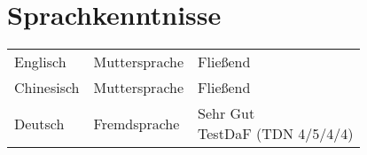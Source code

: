 \section{\textcolor{section_4}{Sprachkenntnisse}}
	\begin{center}
		\renewcommand{\arraystretch}{1.3}
		\renewcommand{\cellalign}{lt}
		\begin{tabularx}{0.9\textwidth}{p{3cm}p{3cm} X}
			Englisch & Muttersprache & Fließend \\
			Chinesisch & Muttersprache & Fließend \\
			Deutsch & Fremdsprache & \makecell{Sehr Gut\\TestDaF (TDN 4/5/4/4)}
		\end{tabularx}
	\end{center}